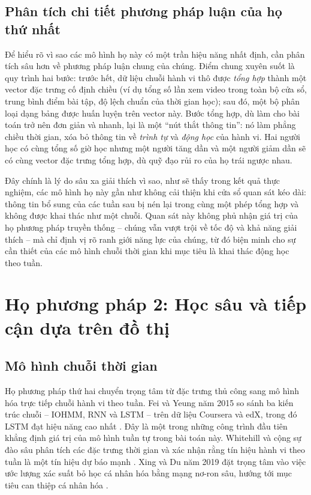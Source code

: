 \subsection{Phân tích chi tiết phương pháp luận của họ thứ nhất}

Để hiểu rõ vì sao các mô hình họ này có một trần hiệu năng nhất định, cần phân tích sâu hơn về phương pháp luận chung của chúng. Điểm chung xuyên suốt là quy trình hai bước: trước hết, dữ liệu chuỗi hành vi thô được \emph{tổng hợp} thành một vector đặc trưng cố định chiều (ví dụ tổng số lần xem video trong toàn bộ cửa sổ, trung bình điểm bài tập, độ lệch chuẩn của thời gian học); sau đó, một bộ phân loại dạng bảng được huấn luyện trên vector này. Bước tổng hợp, dù làm cho bài toán trở nên đơn giản và nhanh, lại là một ``nút thắt thông tin'': nó làm phẳng chiều thời gian, xóa bỏ thông tin về \emph{trình tự} và \emph{động học} của hành vi. Hai người học có cùng tổng số giờ học nhưng một người tăng dần và một người giảm dần sẽ có cùng vector đặc trưng tổng hợp, dù quỹ đạo rủi ro của họ trái ngược nhau.

Đây chính là lý do sâu xa giải thích vì sao, như sẽ thấy trong kết quả thực nghiệm, các mô hình họ này gần như không cải thiện khi cửa sổ quan sát kéo dài: thông tin bổ sung của các tuần sau bị nén lại trong cùng một phép tổng hợp và không được khai thác như một chuỗi. Quan sát này không phủ nhận giá trị của họ phương pháp truyền thống -- chúng vẫn vượt trội về tốc độ và khả năng giải thích -- mà chỉ định vị rõ ranh giới năng lực của chúng, từ đó biện minh cho sự cần thiết của các mô hình chuỗi thời gian khi mục tiêu là khai thác động học theo tuần.

\section{Họ phương pháp 2: Học sâu và tiếp cận dựa trên đồ thị}
\label{sec:hoDL}

\subsection{Mô hình chuỗi thời gian}

Họ phương pháp thứ hai chuyển trọng tâm từ đặc trưng thủ công sang mô hình hóa trực tiếp chuỗi hành vi theo tuần. Fei và Yeung năm 2015 so sánh ba kiến trúc chuỗi -- IOHMM, RNN và LSTM -- trên dữ liệu Coursera và edX, trong đó LSTM đạt hiệu năng cao nhất \cite{Fei2015}. Đây là một trong những công trình đầu tiên khẳng định giá trị của mô hình tuần tự trong bài toán này. Whitehill và cộng sự đào sâu phân tích các đặc trưng thời gian và xác nhận rằng tín hiệu hành vi theo tuần là một tín hiệu dự báo mạnh \cite{Whitehill2017}. Xing và Du năm 2019 đặt trọng tâm vào việc ước lượng xác suất bỏ học cá nhân hóa bằng mạng nơ-ron sâu, hướng tới mục tiêu can thiệp cá nhân hóa \cite{Xing2019}.

